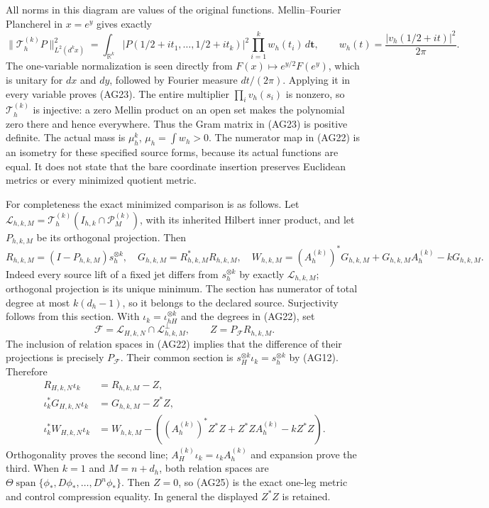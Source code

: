 All norms in this diagram are values of the original functions.
Mellin--Fourier Plancherel in $x=e^y$ gives exactly
\[
 \|\mathcal T_h^{(k)}P\|_{L^2(d^kx)}^2
 =\int_{\mathbb R^k}|P(1/2+it_1,\ldots,1/2+it_k)|^2
                \prod_{i=1}^k w_h(t_i)\,d\mathbf t,
 \qquad w_h(t)=\frac{|v_h(1/2+it)|^2}{2\pi}.
 \tag{AG23}
\]
The one-variable normalization is seen directly from
$F(x)\mapsto e^{y/2}F(e^y)$, which is unitary for $dx$ and $dy$,
followed by Fourier measure $dt/(2\pi)$.  Applying it in every
variable proves (AG23).  The entire multiplier $\prod_i v_h(s_i)$
is nonzero, so $\mathcal T_h^{(k)}$ is injective: a zero Mellin
product on an open set makes the polynomial zero there and hence
everywhere.  Thus the Gram matrix in (AG23) is positive definite.
The actual mass is $\mu_h^k$, $\mu_h=\int w_h>0$.
The numerator map in (AG22) is an isometry for these specified
source forms, because its actual functions are equal.  It does
not state that the bare coordinate insertion preserves Euclidean
metrics or every minimized quotient metric.

For completeness the exact minimized comparison is as follows.
Let $\mathcal L_{h,k,M}=\mathcal T_h^{(k)}
(I_{h,k}\cap\mathcal P_M^{(k)})$, with its inherited Hilbert
inner product, and let $P_{h,k,M}$ be its orthogonal projection.
Then
\[
 R_{h,k,M}=(I-P_{h,k,M})s_h^{\otimes k},\quad
 G_{h,k,M}=R_{h,k,M}^*R_{h,k,M},\quad
 W_{h,k,M}=(A_h^{(k)})^*G_{h,k,M}
             +G_{h,k,M}A_h^{(k)}-kG_{h,k,M}.
 \tag{AG24}
\]
Indeed every source lift of a fixed jet differs from
$s_h^{\otimes k}$ by exactly $\mathcal L_{h,k,M}$;
orthogonal projection is its unique minimum.  The section has
numerator of total degree at most $k(d_h-1)$, so it belongs to
the declared source.  Surjectivity follows from this section.
With $\iota_k=\iota_{hH}^{\otimes k}$ and the degrees in (AG22),
set
\[
 \mathcal F=\mathcal L_{H,k,N}\cap\mathcal L_{h,k,M}^{\perp},
 \qquad Z=P_{\mathcal F}R_{h,k,M}.
\]
The inclusion of relation spaces in (AG22) implies that the difference
of their projections is precisely $P_{\mathcal F}$.  Their common
section is $s_H^{\otimes k}\iota_k=s_h^{\otimes k}$ by (AG12).
Therefore
\[
 \begin{split}
 R_{H,k,N}\iota_k&=R_{h,k,M}-Z,\\
 \iota_k^*G_{H,k,N}\iota_k&=G_{h,k,M}-Z^*Z,\\
 \iota_k^*W_{H,k,N}\iota_k&=W_{h,k,M}
 -( (A_h^{(k)})^*Z^*Z+Z^*ZA_h^{(k)}-kZ^*Z).
 \end{split}\tag{AG25}
\]
Orthogonality proves the second line; $A_H^{(k)}\iota_k=
\iota_kA_h^{(k)}$ and expansion prove the third.  When $k=1$
and $M=n+d_h$, both relation spaces are
$\Theta\operatorname{span}\{\phi_*,D\phi_*,\ldots,D^n\phi_*\}$.
Then $Z=0$, so (AG25) is the exact one-leg metric and control
compression equality.  In general the displayed $Z^*Z$ is retained.

